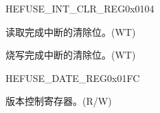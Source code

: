 \begin{register}{H}{EFUSE\_INT\_CLR\_REG}{0x0104}\label{regdesc:EFUSEINTCLRREG}
%
%
%
\regnewline%
\begin{regdesc}\begin{reglist}
\label{fielddesc:EFUSEREADDONEINTCLR}\item [EFUSE\_READ\_DONE\_INT\_CLR] 读取完成中断的清除位。(WT)
\label{fielddesc:EFUSEPGMDONEINTCLR}\item [EFUSE\_PGM\_DONE\_INT\_CLR] 烧写完成中断的清除位。(WT)
\end{reglist}\end{regdesc}
\end{register}


\begin{register}{H}{EFUSE\_DATE\_REG}{0x01FC}\label{regdesc:EFUSEDATEREG}
%
%
\regnewline%
\begin{regdesc}\begin{reglist}
\label{fielddesc:EFUSEDATE}\item [EFUSE\_DATE] 版本控制寄存器。(R/W)
\end{reglist}\end{regdesc}
\end{register}


